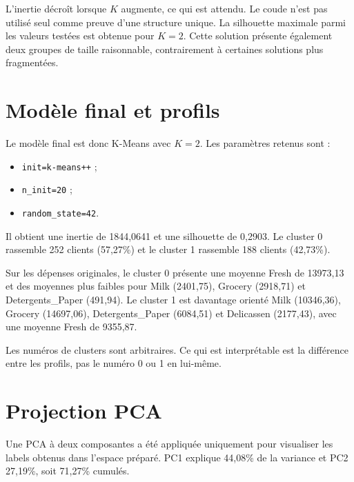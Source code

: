 
L'inertie décroît lorsque $K$ augmente, ce qui est attendu. Le coude n'est pas utilisé seul comme preuve d'une structure unique. La silhouette maximale parmi les valeurs testées est obtenue pour $K=2$. Cette solution présente également deux groupes de taille raisonnable, contrairement à certaines solutions plus fragmentées.

\section{Modèle final et profils}
Le modèle final est donc K-Means avec $K=2$. Les paramètres retenus sont :
\begin{itemize}
  \item \texttt{init=k-means++} ;
  \item \texttt{n\_init=20} ;
  \item \texttt{random\_state=42}.
\end{itemize}
Il obtient une inertie de 1844,0641 et une silhouette de 0,2903. Le cluster 0 rassemble 252 clients (57,27\%) et le cluster 1 rassemble 188 clients (42,73\%).

Sur les dépenses originales, le cluster 0 présente une moyenne Fresh de 13973,13 et des moyennes plus faibles pour Milk (2401,75), Grocery (2918,71) et Detergents\_Paper (491,94). Le cluster 1 est davantage orienté Milk (10346,36), Grocery (14697,06), Detergents\_Paper (6084,51) et Delicassen (2177,43), avec une moyenne Fresh de 9355,87.


Les numéros de clusters sont arbitraires. Ce qui est interprétable est la différence entre les profils, pas le numéro 0 ou 1 en lui-même.

\section{Projection PCA}
Une PCA à deux composantes a été appliquée uniquement pour visualiser les labels obtenus dans l'espace préparé. PC1 explique 44,08\% de la variance et PC2 27,19\%, soit 71,27\% cumulés.

